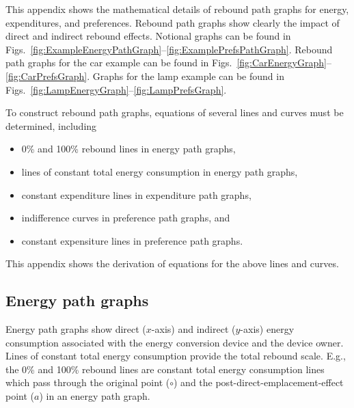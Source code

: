 
This appendix shows the mathematical details of rebound path graphs
for energy, expenditures, and preferences.
Rebound path graphs show clearly the impact of direct and indirect rebound effects.
Notional graphs can be found in 
Figs.~\ref{fig:ExampleEnergyPathGraph}--\ref{fig:ExamplePrefsPathGraph}.
Rebound path graphs for the car example can be found in 
Figs.~\ref{fig:CarEnergyGraph}--\ref{fig:CarPrefsGraph}.
Graphs for the lamp example can be found in
Figs.~\ref{fig:LampEnergyGraph}--\ref{fig:LampPrefsGraph}.

To construct rebound path graphs, equations of several lines and curves 
must be determined, including
%
\begin{itemize}

  \item 0\% and 100\% rebound lines in energy path graphs, 
  
  \item lines of constant total energy consumption
        in energy path graphs, 
        
  \item constant expenditure lines in expenditure path graphs,
  
  \item indifference curves in preference path graphs, and 
  
  \item constant expensiture lines in preference path graphs.

\end{itemize}
%
This appendix shows the derivation of equations for the above lines and curves.

\subsection{Energy path graphs}
\label{sec:energy_path_graph_details}

Energy path graphs show direct ($x$-axis) and indirect ($y$-axis)
energy consumption associated with the energy conversion device 
and the device owner.
Lines of constant total energy consumption provide the total rebound scale.
E.g., the 0\% and 100\% rebound lines are constant total energy consumption
lines which pass through the original point ($\circ$) and
the post-direct-emplacement-effect point ($a$) in an energy path graph.

